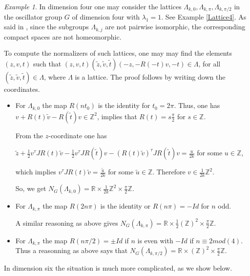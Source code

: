 \documentclass[12pt]{amsart}
\theoremstyle{plain}
\theoremstyle{definition}
\theoremstyle{remark}
\newtheorem{exa}[thm]{Example}
\begin{document}
	\begin{exa}
	In dimension four one may consider the lattices $\Lambda_{k,0}, \Lambda_{k,\pi}, \Lambda_{k,\pi/2}$ in the oscillator group $G$ of dimension four with $\lambda_1=1$. See Example \ref{Lattice4}. As said in \cite{BOV}, since the subgroups $\Lambda_{k,j}$ are not pairwise isomorphic, the corresponding compact spaces are not homeomorphic. 
	
	
To	compute the normalizers of such lattices, one may  may find the elements $(z,v,t)$ such  that
	$(z,v,t)(\tilde{z},\tilde{v},\tilde{t})(-z,-R(-t)v,-t)\in \Lambda$, for  all $(\tilde{z},\tilde{v},\tilde{t})\in \Lambda$, where $\Lambda$ is a lattice. The proof follows by writing down the coordinates. 
	\begin{itemize}
			\item For $\Lambda_{k,0}$ the map $R(nt_0)$ is the identity for $t_0=2\pi$. Thus, one has $v+R(t)\tilde{v}-R(\tilde{t})v\in \mathbb Z^2$, implies that $R(t)=s\frac{\pi}2$ for $s\in \mathbb Z$.
			
			From the $z$-coordinate one has 
			
			\smallskip
			
			$\tilde{z}+\frac12 v^{\tau} JR(t)\tilde{v} -\frac12 v^{\tau} J R(\tilde{t})v-(R(t)\tilde{v})^{\tau}JR(\tilde{t})v= \frac{u}{2k}$ for some $u\in \mathbb Z$,
			
			\smallskip
			
			which implies $v^{\tau}JR(t)\tilde{v}=\frac{\tilde{u}}{2k}$ for some $\tilde{u}\in \mathbb Z$. Therefore $v\in \frac{1}{2k}\mathbb Z^2$. 
			
			So, we get $N_G(\Lambda_{k,0})=\mathbb R\times \frac{1}{2k}\mathbb Z^2\times \frac{\pi}2 \mathbb Z$. 
			
			\item For $\Lambda_{k,\pi}$ the map $R(2n\pi)$ is the identity  or $R(n\pi)=-Id$ for $n$ odd.
			
			A similar reasoning as above gives $N_G(\Lambda_{k,\pi})=\mathbb R\times \frac{1}{2}(\mathbb Z)^2\times \frac{\pi}2 \mathbb Z$.	
		 \item For $\Lambda_{k,\pi}$ the map $R(n\pi/2)=\pm Id$ if $n$ is even with $-Id$ if $n\equiv 2 mod(4)$. Thus a reasonning as above says that
			$N_G(\Lambda_{k,\pi/2})=\mathbb R\times (\mathbb Z)^2 \times \frac{\pi}2 \mathbb Z$.
		\end{itemize}
	In dimension six the situation is much more complicated, as we show below. 
	\end{exa}
\end{document}
